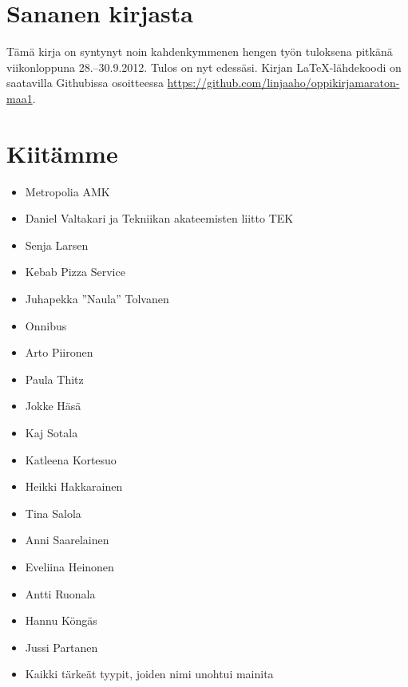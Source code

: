\section*{Sananen kirjasta}

Tämä kirja on syntynyt noin kahdenkymmenen hengen työn tuloksena pitkänä viikonloppuna 28.--30.9.2012. Tulos on nyt edessäsi. Kirjan \LaTeX-lähdekoodi on saatavilla Githubissa osoitteessa \url{https://github.com/linjaaho/oppikirjamaraton-maa1}.



\section*{Kiitämme}
\begin{itemize}
\item Metropolia AMK
\item Daniel Valtakari ja Tekniikan akateemisten liitto TEK
\item Senja Larsen
\item Kebab Pizza Service
\item Juhapekka ''Naula'' Tolvanen
\item Onnibus
\item Arto Piironen
\item Paula Thitz
\item Jokke Häsä
\item Kaj Sotala
\item Katleena Kortesuo
\item Heikki Hakkarainen
\item Tina Salola
\item Anni Saarelainen
\item Eveliina Heinonen
\item Antti Ruonala
\item Hannu Köngäs
\item Jussi Partanen
\item Kaikki tärkeät tyypit, joiden nimi unohtui mainita
\end{itemize}


